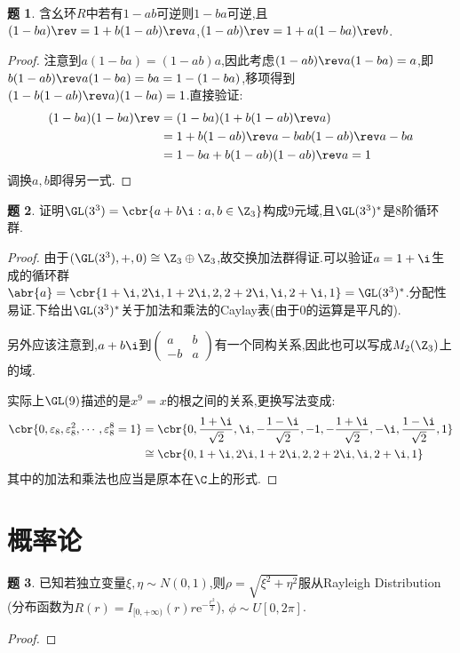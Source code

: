 \documentclass{article}
\newcommand{\matrixtwo}[4]{\begin{pmatrix}#1&#2\\#3&#4 \end{pmatrix}}
\theoremstyle{definition}
\newtheorem{exercise}{题}[section]
\begin{document}
\begin{exercise}
    含幺环$R$中若有$1-ab$可逆则$1-ba$可逆,且$(1-ba)\rev=1+b(1-ab)\rev a$,$(1-ab)\rev=1+a(1-ba)\rev b$.
\end{exercise}
\begin{proof}
    注意到$a(1-ba)=(1-ab)a$,因此考虑$(1-ab)\rev a(1-ba)=a$,即$b(1-ab)\rev a(1-ba)=ba=1-(1-ba)$,移项得到$(1-b(1-ab)\rev a)(1-ba)=1$.直接验证:
$$\begin{aligned}
    (1-ba)(1-ba)\rev &=(1-ba)(1+b(1-ab)\rev a)\\
    &=1+b(1-ab)\rev a-bab(1-ab)\rev a-ba\\
    &=1-ba+b(1-ab)(1-ab)\rev a=1
\end{aligned}$$
调换$a,b$即得另一式.
\end{proof}

\begin{exercise}
    证明$\GL(3^3)=\cbr{a+b\i:a,b\in \Z_3}$构成9元域,且$\GL(3^3)^*$是8阶循环群.
\end{exercise}
\begin{proof}
    由于$(\GL(3^3),+,0)\cong \Z_3\oplus \Z_3$,故交换加法群得证.可以验证$a=1+\i$生成的循环群$\abr{a}=\cbr{1+\i,2\i,1+2\i,2,2+2\i,\i,2+\i,1}=\GL(3^3)^*$.分配性易证.下给出$\GL(3^3)^*$关于加法和乘法的Caylay表(由于0的运算是平凡的).

    另外应该注意到,$a+b\i$到$\matrixtwo{a}{b}{-b}{a}$有一个同构关系,因此也可以写成$M_2(\Z_3)$上的域.

    实际上$\GL(9)$描述的是$x^9=x$的根之间的关系,更换写法变成:
$$\begin{aligned}
    \cbr{0,\varepsilon_8,\varepsilon_8^2,\cdots,\varepsilon_8^8=1}&=\cbr{0,\frac{1+\i}{\sqrt{2}},\i,-\frac{1-\i}{\sqrt{2}},-1,-\frac{1+\i}{\sqrt{2}},-\i,\frac{1-\i}{\sqrt{2}},1}\\
    &\cong\cbr{0,1+\i,2\i,1+2\i,2,2+2\i,\i,2+\i,1}
\end{aligned}$$
其中的加法和乘法也应当是原本在$\C$上的形式.
\end{proof}

\section{概率论}
\begin{exercise}
已知若独立变量$\xi,\eta\sim N(0,1)$,则$\rho=\sqrt{\xi^2+\eta^2}$服从Rayleigh Distribution (分布函数为$R(r)=I_{[0,+\infty)}(r)r\mathrm{e}^{-\frac{r^2}{2}}$), $\phi\sim U[0,2\pi]$.
\end{exercise}
\begin{proof}
    
\end{proof}
\end{document}
